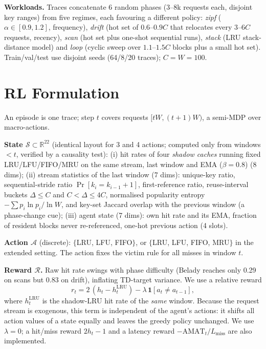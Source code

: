 \documentclass[twocolumn,10pt]{article}
\begin{document}
\textbf{Workloads.} Traces concatenate 6 random phases (3--8k requests each, disjoint key
ranges) from five regimes, each favouring a different policy: \emph{zipf} ($\alpha\!\in\![0.9,1.2]$,
frequency), \emph{drift} (hot set of $0.6$--$0.9C$ that relocates every $3$--$6C$ requests,
recency), \emph{scan} (hot set plus one-shot sequential runs), \emph{stack} (LRU stack-distance
model) and \emph{loop} (cyclic sweep over $1.1$--$1.5C$ blocks plus a small hot set).
Train/val/test use disjoint seeds (64/8/20 traces); $C{=}W{=}100$.

\section{RL Formulation}
An episode is one trace; step $t$ covers requests $[tW,(t{+}1)W)$, a semi-MDP over macro-actions.

\textbf{State $\mathcal{S}\subset\mathbb{R}^{22}$} (identical layout for 3 and 4 actions; computed only
from windows $<t$, verified by a causality test): (i) hit rates of four \emph{shadow caches}
running fixed LRU/LFU/FIFO/MRU on the same stream, last window and EMA ($\beta{=}0.8$) (8 dims);
(ii) stream statistics of the last window (7 dims): unique-key ratio, sequential-stride ratio
$\Pr[k_i{=}k_{i-1}{+}1]$, first-reference ratio, reuse-interval buckets $\Delta\!\le\!C$ and
$C\!<\!\Delta\!\le\!4C$, normalised popularity entropy $-\sum p_i\ln p_i/\ln W$, and key-set Jaccard
overlap with the previous window (a phase-change cue); (iii) agent state (7 dims): own hit rate and
its EMA, fraction of resident blocks never re-referenced, one-hot previous action (4 slots).

\textbf{Action $\mathcal{A}$} (discrete): $\{$LRU, LFU, FIFO$\}$, or $\{$LRU, LFU, FIFO, MRU$\}$
in the extended setting. The action fixes the victim rule for all misses in window $t$.

\textbf{Reward $\mathcal{R}$.} Raw hit rate swings with phase difficulty (Belady reaches only
0.29 on scans but 0.83 on drift), inflating TD-target variance. We use a relative reward
\begin{equation}
  r_t = 2\,(h_t - h^{\text{LRU}}_t) - \lambda\,\mathbf{1}[a_t\neq a_{t-1}],
\end{equation}
where $h^{\text{LRU}}_t$ is the shadow-LRU hit rate of the \emph{same} window. Because the request
stream is exogenous, this term is independent of the agent's actions: it shifts all action values
of a state equally and leaves the greedy policy unchanged. We use $\lambda{=}0$; a hit/miss reward
$2h_t{-}1$ and a latency reward $-\text{AMAT}_t/L_{\text{miss}}$ are also implemented.
\end{document}
